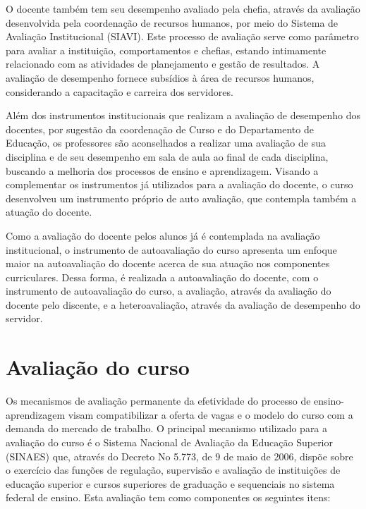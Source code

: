 O docente também tem seu desempenho avaliado pela chefia, através da avaliação desenvolvida pela coordenação de recursos humanos, por meio do Sistema de Avaliação Institucional (SIAVI). Este processo de avaliação serve como parâmetro para avaliar a instituição, comportamentos e chefias, estando intimamente relacionado com as atividades de planejamento e gestão de resultados. A avaliação de desempenho fornece subsídios à área de recursos humanos, considerando a capacitação e carreira dos servidores.


Além dos instrumentos institucionais que realizam a avaliação de desempenho dos docentes, por sugestão da coordenação de Curso e do Departamento de Educação, os professores são aconselhados a realizar uma avaliação de sua disciplina e de seu desempenho em sala de aula ao final de cada disciplina, buscando a melhoria dos processos de ensino e aprendizagem. Visando a complementar os instrumentos já utilizados para a avaliação do docente, o curso desenvolveu um instrumento próprio de auto avaliação, que contempla também a atuação do docente.

Como a avaliação do docente pelos alunos já é contemplada na avaliação institucional, o instrumento de autoavaliação do curso apresenta um enfoque maior na autoavaliação do docente acerca de sua atuação nos componentes curriculares. Dessa forma, é realizada a autoavaliação do docente, com o instrumento de autoavaliação do curso, a avaliação, através da avaliação do docente pelo discente, e a heteroavaliação, através da avaliação de desempenho do servidor.

\section{Avaliação do curso}

Os mecanismos de avaliação permanente da efetividade do processo de ensino-aprendizagem visam compatibilizar a oferta de vagas e o modelo do curso com a demanda do mercado de trabalho. O principal mecanismo utilizado para a avaliação do curso é o Sistema Nacional de Avaliação da Educação Superior (SINAES) que, através do Decreto No 5.773, de 9 de maio de 2006, dispõe sobre o exercício das funções de regulação, supervisão e avaliação de instituições de educação superior e cursos superiores de graduação e sequenciais no sistema federal de ensino. Esta avaliação tem como componentes os seguintes itens:

